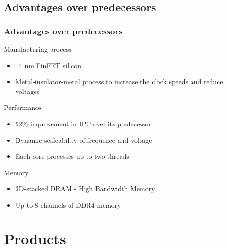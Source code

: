 \documentclass{beamer}
\begin{document}
	\subsection{Advantages over predecessors}	
	\begin{frame}
		\frametitle{Advantages over predecessors}
		\begin{block}{Manufacturing process}
			\begin{itemize}
				\item 14 nm FinFET silicon
				\item Metal-insulator-metal process to increase the clock speeds and reduce voltages
			\end{itemize}
		\end{block}		
		\begin{block}{Performance}
			\begin{itemize}
				\item 52\% improvement in IPC over its predecessor 
				\item Dynamic scaleability of frequence and voltage
				\item Each core processes up to two threads
			\end{itemize}
		\end{block}		
		\begin{block}{Memory}
			\begin{itemize}
				\item 3D-stacked DRAM - High Bandwidth Memory 
				\item Up to 8 channels of DDR4 memory	
			\end{itemize}
		\end{block}
	\end{frame}	
	\section{Products}
\end{document}
